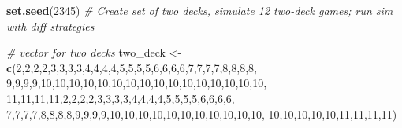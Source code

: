 \documentclass[]{article}
\newenvironment{Shaded}{\begin{snugshade}}{\end{snugshade}}
\newcommand{\KeywordTok}[1]{\textcolor[rgb]{0.13,0.29,0.53}{\textbf{#1}}}
\newcommand{\DecValTok}[1]{\textcolor[rgb]{0.00,0.00,0.81}{#1}}
\newcommand{\StringTok}[1]{\textcolor[rgb]{0.31,0.60,0.02}{#1}}
\newcommand{\CommentTok}[1]{\textcolor[rgb]{0.56,0.35,0.01}{\textit{#1}}}
\newcommand{\NormalTok}[1]{#1}
\begin{document}
\begin{Shaded}
\begin{Highlighting}[]
\KeywordTok{set.seed}\NormalTok{(}\DecValTok{2345}\NormalTok{)}
\CommentTok{# Create set of two decks, simulate 12 two-deck games; run sim with diff strategies}

\CommentTok{# vector for two decks}
\NormalTok{two_deck <-}\StringTok{ }\KeywordTok{c}\NormalTok{(}\DecValTok{2}\NormalTok{,}\DecValTok{2}\NormalTok{,}\DecValTok{2}\NormalTok{,}\DecValTok{2}\NormalTok{,}\DecValTok{3}\NormalTok{,}\DecValTok{3}\NormalTok{,}\DecValTok{3}\NormalTok{,}\DecValTok{3}\NormalTok{,}\DecValTok{4}\NormalTok{,}\DecValTok{4}\NormalTok{,}\DecValTok{4}\NormalTok{,}\DecValTok{4}\NormalTok{,}\DecValTok{5}\NormalTok{,}\DecValTok{5}\NormalTok{,}\DecValTok{5}\NormalTok{,}\DecValTok{5}\NormalTok{,}\DecValTok{6}\NormalTok{,}\DecValTok{6}\NormalTok{,}\DecValTok{6}\NormalTok{,}\DecValTok{6}\NormalTok{,}\DecValTok{7}\NormalTok{,}\DecValTok{7}\NormalTok{,}\DecValTok{7}\NormalTok{,}\DecValTok{7}\NormalTok{,}\DecValTok{8}\NormalTok{,}\DecValTok{8}\NormalTok{,}\DecValTok{8}\NormalTok{,}\DecValTok{8}\NormalTok{,}
              \DecValTok{9}\NormalTok{,}\DecValTok{9}\NormalTok{,}\DecValTok{9}\NormalTok{,}\DecValTok{9}\NormalTok{,}\DecValTok{10}\NormalTok{,}\DecValTok{10}\NormalTok{,}\DecValTok{10}\NormalTok{,}\DecValTok{10}\NormalTok{,}\DecValTok{10}\NormalTok{,}\DecValTok{10}\NormalTok{,}\DecValTok{10}\NormalTok{,}\DecValTok{10}\NormalTok{,}\DecValTok{10}\NormalTok{,}\DecValTok{10}\NormalTok{,}\DecValTok{10}\NormalTok{,}\DecValTok{10}\NormalTok{,}\DecValTok{10}\NormalTok{,}\DecValTok{10}\NormalTok{,}\DecValTok{10}\NormalTok{,}\DecValTok{10}\NormalTok{,}
              \DecValTok{11}\NormalTok{,}\DecValTok{11}\NormalTok{,}\DecValTok{11}\NormalTok{,}\DecValTok{11}\NormalTok{,}\DecValTok{2}\NormalTok{,}\DecValTok{2}\NormalTok{,}\DecValTok{2}\NormalTok{,}\DecValTok{2}\NormalTok{,}\DecValTok{3}\NormalTok{,}\DecValTok{3}\NormalTok{,}\DecValTok{3}\NormalTok{,}\DecValTok{3}\NormalTok{,}\DecValTok{4}\NormalTok{,}\DecValTok{4}\NormalTok{,}\DecValTok{4}\NormalTok{,}\DecValTok{4}\NormalTok{,}\DecValTok{5}\NormalTok{,}\DecValTok{5}\NormalTok{,}\DecValTok{5}\NormalTok{,}\DecValTok{5}\NormalTok{,}\DecValTok{6}\NormalTok{,}\DecValTok{6}\NormalTok{,}\DecValTok{6}\NormalTok{,}\DecValTok{6}\NormalTok{,}
              \DecValTok{7}\NormalTok{,}\DecValTok{7}\NormalTok{,}\DecValTok{7}\NormalTok{,}\DecValTok{7}\NormalTok{,}\DecValTok{8}\NormalTok{,}\DecValTok{8}\NormalTok{,}\DecValTok{8}\NormalTok{,}\DecValTok{8}\NormalTok{,}\DecValTok{9}\NormalTok{,}\DecValTok{9}\NormalTok{,}\DecValTok{9}\NormalTok{,}\DecValTok{9}\NormalTok{,}\DecValTok{10}\NormalTok{,}\DecValTok{10}\NormalTok{,}\DecValTok{10}\NormalTok{,}\DecValTok{10}\NormalTok{,}\DecValTok{10}\NormalTok{,}\DecValTok{10}\NormalTok{,}\DecValTok{10}\NormalTok{,}\DecValTok{10}\NormalTok{,}\DecValTok{10}\NormalTok{,}\DecValTok{10}\NormalTok{,}\DecValTok{10}\NormalTok{,}
              \DecValTok{10}\NormalTok{,}\DecValTok{10}\NormalTok{,}\DecValTok{10}\NormalTok{,}\DecValTok{10}\NormalTok{,}\DecValTok{10}\NormalTok{,}\DecValTok{11}\NormalTok{,}\DecValTok{11}\NormalTok{,}\DecValTok{11}\NormalTok{,}\DecValTok{11}\NormalTok{)}


\end{Highlighting}
\end{Shaded}
\end{document}
